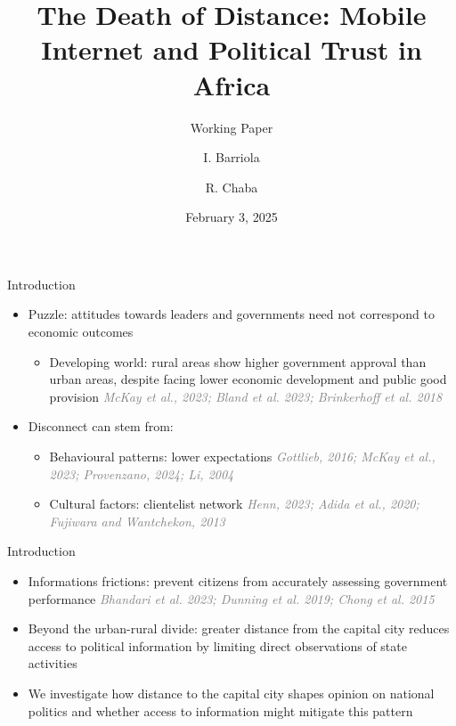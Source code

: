 \documentclass[10pt]{beamer}
\newenvironment{hidepagenumberframe}
  {\setbeamertemplate{footline}{}\begin{frame}}
  {\end{frame}\setbeamertemplate{footline}{
     \hfill{\fontsize{8pt}{16pt}\selectfont\insertframenumber}\hspace{1em}}}
\begin{document}
\author[I. Barriola, R. Chaba]{I. Barriola \and R. Chaba}

\title{The Death of Distance: Mobile Internet and Political Trust in Africa}
\subtitle{Working Paper}
\date{February 3, 2025}


\begin{hidepagenumberframe}
    \titlepage
\end{hidepagenumberframe}

\begin{frame}{Introduction}
    \begin{itemize}\setlength\itemsep{1em}

        \item Puzzle: attitudes towards leaders and governments need not correspond to economic outcomes
        \begin{itemize}\setlength\itemsep{1em}

            \item Developing world: rural areas show higher government approval than urban areas, despite facing lower economic development and public good provision \textcolor{gray}{\textit{McKay et al., 2023; Bland et al. 2023; Brinkerhoff et al. 2018}}
        \end{itemize}
        \item Disconnect can stem from:
        \begin{itemize}\setlength\itemsep{1em}

            \item Behavioural patterns: lower expectations \textcolor{gray}{\textit{Gottlieb, 2016; McKay et al., 2023; Provenzano, 2024; Li, 2004}}
            \item Cultural factors: clientelist network \textcolor{gray}{\textit{Henn, 2023; Adida et al., 2020; Fujiwara and Wantchekon, 2013}}
        \end{itemize}
    \end{itemize}
\end{frame}

\begin{frame}{Introduction}
    \begin{itemize}\setlength\itemsep{1em}

        \item Informations frictions: prevent citizens from accurately assessing government performance \textcolor{gray}{\textit{Bhandari et al. 2023; Dunning et al. 2019; Chong et al. 2015}}
        \item Beyond the urban-rural divide: greater distance from the capital city reduces access to political information by limiting direct observations of state activities
        \item We investigate how distance to the capital city shapes opinion on national politics and whether access to information might mitigate this pattern
    \end{itemize}
\end{frame}
\end{document}
